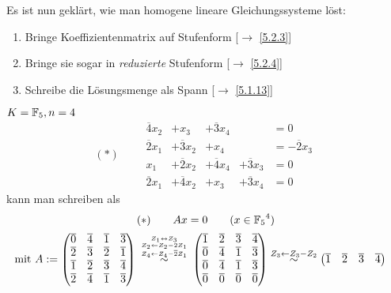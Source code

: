 \documentclass[../../main.tex]{subfiles}
\begin{document}
\begin{bem}\label{5.2.5}
Es ist nun geklärt, wie man homogene lineare Gleichungssysteme löst:
\begin{enumerate}[\normalfont(a)]
\item Bringe Koeffizientenmatrix auf Stufenform [$\to$ \ref{5.2.3}]
\item Bringe sie sogar in \emph{reduzierte} Stufenform [$\to$ \ref{5.2.4}]
\item Schreibe die Lösungsmenge als Spann [$\to$ \ref{5.1.13}]
\end{enumerate}
\end{bem}

\begin{bsp}\label{5.2.6}
$K = \mathbb F_5, n = 4$
$$ (*)\qquad
\begin{array}{l*{6}{l}}
\overline{4}x_2 & + x_3 & + \overline{3}x_4 & & = 0\\
\overline{2}x_1 & + \overline{3}x_2 & + x_4 & & = -\overline{2}x_3 \\
x_1 & + \overline{2}x_2 & +\overline{4}x_4 &+ \overline{3}x_3 &=0\\
\overline{2}x_1 & +\overline{4}x_2 & +x_3 & +\overline{3}x_4 & = 0
\end{array}
$$
kann man schreiben als
\[(*)\qquad Ax = 0\qquad (x\in {\mathbb F_5}^4)\] 
\begin{align*}
\text{mit }A:=\begin{pmatrix}
\overline{0} & \overline{4} & \overline{1} & \overline{3}\\
\overline{2} & \overline{3} & \overline{2} & \overline{1}\\
\overline{1} & \overline{2} & \overline{3} & \overline{4}\\
\overline{2} & \overline{4} & \overline{1} & \overline{3}
\end{pmatrix}&\overset{\over{Z_1\leftrightarrow Z_3}{\over{Z_2\leftarrow Z_2-2Z_1}{Z_4\leftarrow Z_4-\overline{2}Z_1}}}{\sim}\begin{pmatrix}
\overline{1} & \overline{2} & \overline{3} & \overline{4}\\
\overline{0} & \overline{4} & \overline{1} & \overline{3}\\
\overline{0} & \overline{4} & \overline{1} & \overline{3}\\
\overline{0} & \overline{0} & \overline{0} & \overline{0}
\end{pmatrix}\overset{Z_3\leftarrow Z_3-Z_2}{\sim}\begin{pmatrix}
\overline{1} & \overline{2} & \overline{3} & \overline{4}\\

\end{pmatrix}
\end{align*}
\end{bsp}
\end{document}
